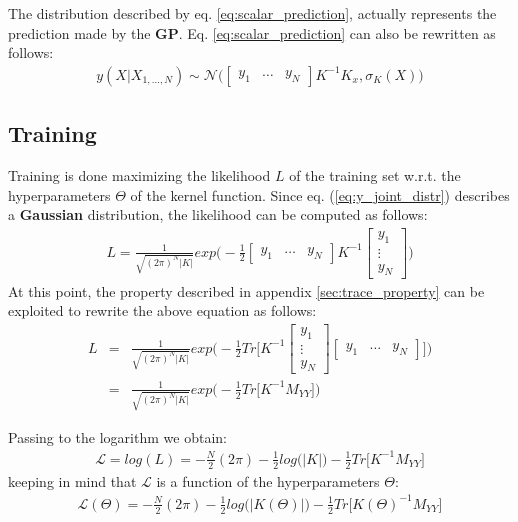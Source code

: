 \documentclass{article}
\begin{document}
The distribution described by eq. \ref{eq:scalar_prediction}, actually represents the prediction made by the \textbf{GP}. Eq. \ref{eq:scalar_prediction} can also be rewritten as follows:
\begin{eqnarray}
y(X | X_{1,\hdots,N}) 
\sim \mathcal{N} \bigg (
\begin{bmatrix} y_1 & \hdots & y_N \end{bmatrix}
K^{-1} K_x, 
\sigma_K(X)
\bigg ) 
\end{eqnarray}

\subsection{Training}
\label{sec:train_scalar}

Training is done maximizing the likelihood $L$ of the training set w.r.t. the hyperparameters $\Theta$ of the kernel function.
Since eq. (\ref{eq:y_joint_distr}) describes a \textbf{Gaussian} distribution, the likelihood can be computed as follows:
\begin{eqnarray}
L = 
\frac{1}{\sqrt{(2 \pi)^N \left | K \right | }}
exp \bigg ( - \frac{1}{2}
\begin{bmatrix} y_1 & \hdots & y_N \end{bmatrix} 
K^{-1}
\begin{bmatrix} y_1 \\ \vdots \\ y_N \end{bmatrix} 
\bigg ) 
\end{eqnarray}
At this point, the property described in appendix \ref{sec:trace_property} can be exploited to rewrite the above equation as follows:
\begin{eqnarray}
L &=& 
\frac{1}{\sqrt{(2 \pi)^N \left | K \right | }}
exp \bigg ( - \frac{1}{2}
Tr \bigg [ 
K^{-1}
\begin{bmatrix} y_1 \\ \vdots \\ y_N \end{bmatrix} 
\begin{bmatrix} y_1 & \hdots & y_N \end{bmatrix} 
\bigg ]
\bigg ) \\
&=&
\frac{1}{\sqrt{(2 \pi)^N \left | K \right | }}
exp \bigg ( - \frac{1}{2}
Tr \bigg [ 
K^{-1}
M_{YY}
\bigg ]
\bigg )
\end{eqnarray}

Passing to the logarithm we obtain:
\begin{eqnarray}
\mathcal{L} = log(L) = 
-\frac{N}{2}(2 \pi) 
-\frac{1}{2} log \big (\left | K \right | \big )
-\frac{1}{2} Tr \bigg [
K^{-1} M_{YY}
\bigg ] 
\end{eqnarray}
keeping in mind that $\mathcal{L}$ is a function of the hyperparameters $\Theta$:
\begin{eqnarray}
\mathcal{L}(\Theta) = 
-\frac{N}{2}(2 \pi) 
-\frac{1}{2} log \big (\left | K(\Theta) \right | \big )
-\frac{1}{2} Tr \bigg [
K(\Theta)^{-1} M_{YY}
\bigg ] 
\end{eqnarray}
\end{document}
